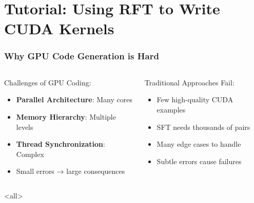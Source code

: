 \documentclass[aspectratio=169]{beamer}
\begin{document}
\section{Tutorial: Using RFT to Write CUDA Kernels}

\begin{frame}[shrink=10]
	\frametitle{Why GPU Code Generation is Hard}
	\begin{columns}[T]
		\begin{column}{0.48\textwidth}
			\begin{block}{Challenges of GPU Coding:}
				\begin{itemize}\setlength{\itemsep}{0em}
					\item \textbf{Parallel Architecture}: Many cores
					\item \textbf{Memory Hierarchy}: Multiple levels
					\item \textbf{Thread Synchronization}: Complex
					\item Small errors → large consequences
				\end{itemize}
			\end{block}
		\end{column}
		\begin{column}{0.48\textwidth}
			\begin{block}{Traditional Approaches Fail:}
				\begin{itemize}\setlength{\itemsep}{0em}
					\item Few high-quality CUDA examples
					\item SFT needs thousands of pairs
					\item Many edge cases to handle
					\item Subtle errors cause failures
				\end{itemize}
			\end{block}
		\end{column}
	\end{columns}
\end{frame}

\mode<all>{\vspace{-0.5cm}}
\end{document}
